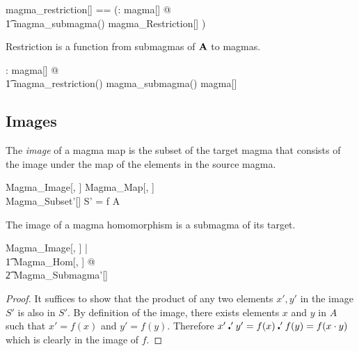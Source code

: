 \documentclass{amsart}
\begin{document}
\begin{zed}
	magma\_restriction[\genT] == (\lambda \strucA: magma[\genT] @ \\
	\t1	magma\_submagma(\strucA) \dres magma\_Restriction[\genT] )
\end{zed}

\begin{remark}
Restriction is a function from submagmas of $\mathbf{A}$ to magmas.

\begin{zed}
	\forall \strucA: magma[\setT] @ \\
	\t1	magma\_restriction(\strucA) \in magma\_submagma(\strucA) \fun magma[\setT]
\end{zed}

\end{remark}

\subsection{Images}

The \textit{image} of a magma map is the subset of the target magma that consists of
the image under the map of the elements in the source magma.

\begin{schema}{Magma\_Image}[\genT, \genU]
	Magma\_Map[\genT, \genU] \\
	Magma\_Subset'[\genU]
\where
	S' = f \limg A \rimg
\end{schema}

\begin{remark}
The image of a magma homomorphism is a submagma of its target.

\begin{zed}
	\forall Magma\_Image[\setT, \setU] | \\
	\t1	Magma\_Hom[\setT, \setU] @ \\
	\t2		Magma\_Submagma'[\setU]
\end{zed}

\begin{proof}
It suffices to show that the product of any two elements $x', y'$ in the image $S'$ is 
also in $S'$. By definition of the image, there exists elements $x$ and $y$ in $A$
such that $x' = f(x)$ and $y' = f(y)$.
Therefore $x' \mathbin{\centerdot}' y' = f(x) \mathbin{\centerdot}' f(y) = f(x \mathbin{\cdot} y)$ which is clearly in the image of $f$. 
\end{proof}

\end{remark}
\end{document}
